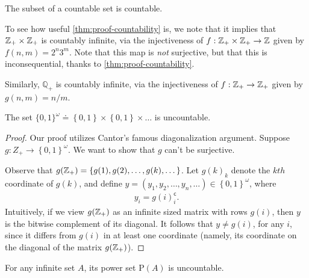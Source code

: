 \begin{corollary}
	The subset of a countable set is countable.	
\end{corollary}

To see how useful \cref{thm:proof-countability} is, we note that it implies that
$\mathbb{Z}_{+} \times \mathbb{Z}_{+}$ is countably infinite, via the injectiveness of $f:
\mathbb{Z}_{+} \times \mathbb{Z}_{+} \to \mathbb{Z}$ given by $f(n,m) = 2^{n} 3^{m}$. Note that this
map is \emph{not} surjective, but that this is inconsequential, thanks to 
\cref{thm:proof-countability}.

Similarly, $\mathbb{Q}_{+}$ is countably infinite, via the injectiveness
of $f: \mathbb{Z}_{+} \to \mathbb{Z}_{+}$ given by $g(n,m) = n/m$.
\begin{theorem}\label{thm:cantor}
	The set $\{ 0,1 \}^{\omega}
	\doteq \left\{ 0,1 \right\} \times
	\left\{ 0,1 \right\} \times \dots$ is uncountable.
\end{theorem}
\begin{proof}
	Our proof utilizes Cantor's famous diagonalization argument. 
	Suppose $g: Z_{+} \to \left\{ 0,1 \right\}^{\omega}$. We want to show that
	$g$ can't be surjective. 

	Observe that $g(\mathbb{Z}_{+}) = \left\{ g(1), g(2), \dots, g(k), \dots \right\}$.
	Let $g(k)_{k}$ denote the $kth$ coordinate of $g(k)$, and define
	$y = (y_{1}, y_{2}, \dots, y_{n}, \dots) \in \left\{ 0,1 \right\}^{\omega}$,
	where
	\begin{equation*}
		\begin{split}
			y_{i} = g(i)_{i}^{\mathsf{c}}.
		\end{split}
	\end{equation*}
	Intuitively, if we view $g(\mathbb{Z}_{+})$ as an infinite sized matrix with rows
	$g(i)$, then $y$ is the bitwise complement of its diagonal. It follows that
	$y \neq g(i)$, for any $i$, since it differs from $g(i)$ in at least one
	coordinate (namely, its coordinate on the diagonal of the matrix
	$g(\mathbb{Z}_{+})$). 
\end{proof}
\begin{corollary}
	For any infinite set $A$, its power set $\mathrm{P}(A)$ is uncountable.
\end{corollary}
